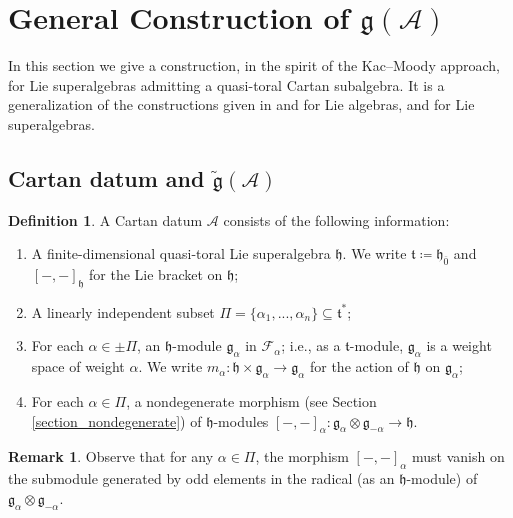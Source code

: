 \documentclass[12pt, a4paper, reqno]{amsart}
\def\AA{\mathcal{A}}
\def\FF{\mathcal{F}}
\def\g{\mathfrak{g}}
\def\h{\mathfrak{h}}
\def\ol{\overline}
\theoremstyle{definition}
\newtheorem{definition}{Definition}
\theoremstyle{definition}
\newtheorem{remark}{Remark}
\theoremstyle{definition}
\numberwithin{theorem}{section}
\numberwithin{lemma}{section}
\numberwithin{remark}{section}
\numberwithin{definition}{section}
\numberwithin{corollary}{section}
\numberwithin{proposition}{section}
\numberwithin{example}{section}
\begin{document}
	
	\section{General Construction of $\g(\AA)$}
	
	
	In this section we give a construction, in the spirit of the Kac--Moody approach, for Lie superalgebras admitting a quasi-toral Cartan subalgebra. It is a generalization of the constructions given in \cite{K} and \cite{K3} for Lie algebras, and \cite{K2} for Lie superalgebras.
	
	\subsection{Cartan datum and $\tilde{\g}(\AA)$}\label{section_cartan_datum}
	\begin{definition}\label{definition-datum} 
		A Cartan datum \(\mathcal{A}\) consists of the following information:
		\begin{enumerate}
			\item A finite-dimensional quasi-toral Lie superalgebra \(\mathfrak{h}\). We write \(\mathfrak{t} \coloneq \mathfrak{h}_{\ol{0}}\) and \([-,-]_{\mathfrak{h}}\) for the Lie bracket on \(\mathfrak{h}\);
			\item A linearly independent subset \(\Pi = \{\alpha_1,...,\alpha_n\}\subseteq\mathfrak{t}^*\);
			\item For each $\alpha \in \pm \Pi$, an \(\mathfrak{h}\)-module \(\mathfrak{g}_{\alpha}\) in $\FF_{\alpha}$; i.e., as a \(\mathfrak{t}\)-module, $\g_{\alpha}$ is a weight space of weight \(\alpha\). We write \(m_{\alpha} : \mathfrak{h} \times \mathfrak{g}_{\alpha} \rightarrow \mathfrak{g}_{\alpha}\) for the action of \(\mathfrak{h}\) on \(\mathfrak{g}_{\alpha}\);
			\item\label{definition-datum-step-4} For each \(\alpha \in \Pi\), a nondegenerate morphism (see Section \ref{section_nondegenerate}) of \(\mathfrak{h}\)-modules \newline \([-,-]_{\alpha} : \mathfrak{g}_{\alpha}\otimes \mathfrak{g}_{-\alpha} \rightarrow \mathfrak{h}\).
		\end{enumerate}
	\end{definition}
	
	\begin{remark}\label{remark on vanishing}
		Observe that for any $\alpha\in\Pi$, the morphism $[-,-]_{\alpha}$ must vanish on the submodule generated by odd elements in the radical (as an $\h$-module) of $\g_{\alpha}\otimes\g_{-\alpha}$.
	\end{remark}
	
\end{document}
